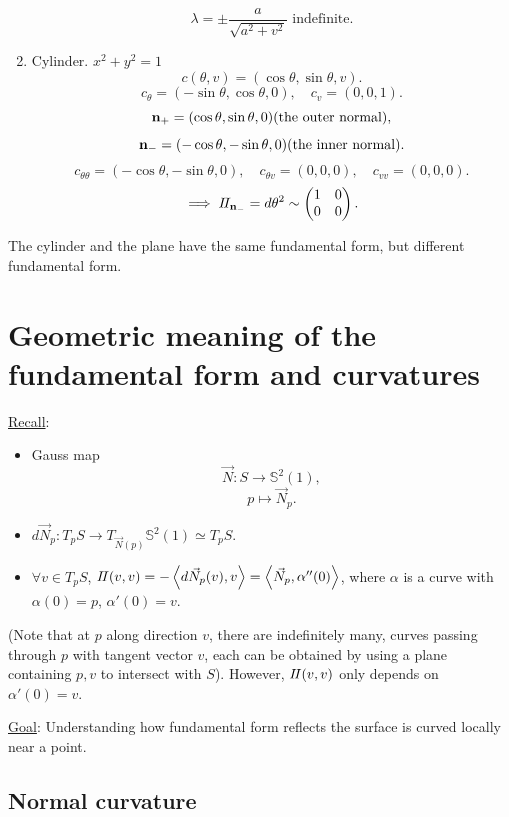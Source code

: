 \begin{example}
\begin{enumerate}[(1)]
\[        \lambda=\pm \frac{a}{\sqrt{a^2+v^2}}\text{ indefinite}.
    \]
    \item Cylinder. \(x^2+y^2=1\)
    \[
        c(\theta,v)=(\cos \theta,\sin\theta,v).    
    \]
    \[
        c_\theta=(-\sin \theta,\cos \theta,0),\quad
        c_v=(0,0,1).    
    \]
    \[
        \vb{n}_+=(\cos\theta,\sin\theta,0)(\text{the outer normal}),    
    \]
    \[
        \vb{n}_-=(-\cos\theta,-\sin\theta,0)(\text{the inner normal}).
    \]
    \[
        c_{\theta\theta}=(-\cos \theta,-\sin\theta,0),\quad
        c_{\theta v}=(0,0,0),\quad
        c_{vv}=(0,0,0).    
    \]
    \[\implies I\!I_{\vb{n}_-}=d \theta^2\sim \begin{pmatrix}
        1&0\\0&0
    \end{pmatrix}.\]
    \end{enumerate}  
\end{example}
\begin{remark}
    The cylinder and the plane have the same  fundamental
    form, but different  fundamental form.
\end{remark}
\section{Geometric meaning of the \texorpdfstring{}{2nd} fundamental form and curvatures}
\underline{Recall}: \begin{itemize}
    \item Gauss map \[\vec{N}\colon S\to \mathbb{S}^2(1),\]
    \[p\mapsto \vec{N}_p.\]
    \item \(d \vec{N}_p\colon T_p S\to T_{\vec{N}(p)}\mathbb{S}^2(1)
    \simeq T_p S\).
    \item \(\forall v \in T_p S\), \(I\!I(v,v)=-\left\langle d 
    \vec{N}_p(v),v
    \right\rangle=\left\langle \vec{N}_p,
    \alpha''(0)\right\rangle\), where
    \(\alpha\) is a curve with \(\alpha(0)=p\), \(\alpha'(0)=v\).
\end{itemize}
(Note that at \(p\) along direction \(v\), there are indefinitely
many, curves passing through \(p\) with tangent vector \(v\), each
can be obtained by using a plane containing \(p,v\) to intersect with
\(S\)). However, \(I\!I(v,v)\) only depends on \(\alpha'(0)=v\).

\underline{Goal}: Understanding how  fundamental 
form reflects the surface is curved locally near a point.
\subsection{Normal curvature}
    
